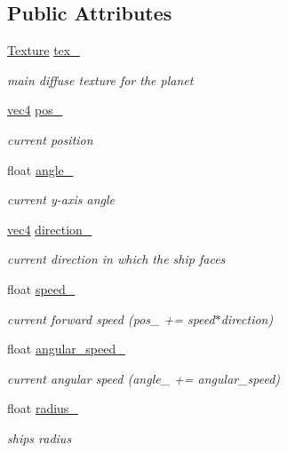 \subsection*{Public Attributes}
\begin{DoxyCompactItemize}
\item 
\hyperlink{classTexture}{Texture} \hyperlink{classShip_a4e83f38e706d9b6dde212a62f855ae4c}{tex\+\_\+}
\begin{DoxyCompactList}\small\item\em main diffuse texture for the planet \end{DoxyCompactList}\item 
\hyperlink{classvec4}{vec4} \hyperlink{classShip_abb51f0860d7fecc14bc10b8955ca2f61}{pos\+\_\+}
\begin{DoxyCompactList}\small\item\em current position \end{DoxyCompactList}\item 
float \hyperlink{classShip_ac1eecf17b4d217e4379fe3b83082f570}{angle\+\_\+}
\begin{DoxyCompactList}\small\item\em current y-\/axis angle \end{DoxyCompactList}\item 
\hyperlink{classvec4}{vec4} \hyperlink{classShip_aaf08394bcc18913a81303668cd865fa1}{direction\+\_\+}
\begin{DoxyCompactList}\small\item\em current direction in which the ship faces \end{DoxyCompactList}\item 
float \hyperlink{classShip_a0f013dc95c2aa775f3245fd603179983}{speed\+\_\+}
\begin{DoxyCompactList}\small\item\em current forward speed (pos\+\_\+ += speed$\ast$direction) \end{DoxyCompactList}\item 
float \hyperlink{classShip_a5ddc78691bc11038daf5b323579c1da9}{angular\+\_\+speed\+\_\+}
\begin{DoxyCompactList}\small\item\em current angular speed (angle\+\_\+ += angular\+\_\+speed) \end{DoxyCompactList}\item 
float \hyperlink{classShip_a4fd3b5e924dfd2d5e8484d769be8a758}{radius\+\_\+}
\begin{DoxyCompactList}\small\item\em ship\textquotesingle{}s radius \end{DoxyCompactList}\end{DoxyCompactItemize}
